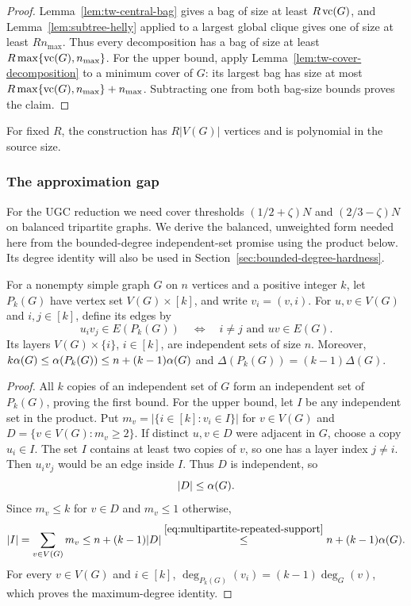 \begin{proof}
Lemma~\ref{lem:tw-central-bag} gives a bag of size at least $R\operatorname{vc}(G)$,
and Lemma~\ref{lem:subtree-helly} applied to a largest global clique
gives one of size at least $Rn_{\max}$.
Thus every decomposition has a bag of size at least
$R\max\{\operatorname{vc}(G),n_{\max}\}$. For the upper bound, apply
Lemma~\ref{lem:tw-cover-decomposition} to a minimum cover of $G$:
its largest bag has size at most
$R\max\{\operatorname{vc}(G),n_{\max}\}+n_{\max}$. Subtracting one from both
bag-size bounds proves the claim.
\end{proof}

For fixed $R$, the construction has $R|V(G)|$ vertices and is
polynomial in the source size.

\subsubsection{The approximation gap}
\label{subsec:ugc-tw-gap}

For the UGC reduction we need cover thresholds $(1/2+\zeta)N$ and
$(2/3-\zeta)N$ on balanced tripartite graphs.
We derive the balanced, unweighted form needed here from the
bounded-degree independent-set promise using the product below. Its degree
identity will also be used in
Section~\ref{sec:bounded-degree-hardness}.

\begin{lemma}\label{lem:multipartite-product}
For a nonempty simple graph $G$ on $n$ vertices and a positive integer
$k$, let $P_k(G)$ have vertex set $V(G)\times[k]$, and write
$v_i=(v,i)$. For $u,v\in V(G)$ and $i,j\in[k]$, define its edges by
\[
 u_iv_j\in E(P_k(G))\quad\Longleftrightarrow\quad
 i\ne j\text{ and }uv\in E(G).
\]
Its layers $V(G)\times\{i\}$, $i\in[k]$, are independent sets of size $n$. Moreover,
$k\alpha(G)\le\alpha(P_k(G))\le n+(k-1)\alpha(G)$ and
$\Delta(P_k(G))=(k-1)\Delta(G)$.
\end{lemma}

\begin{proof}
All $k$ copies of an independent set of $G$ form an independent
set of $P_k(G)$, proving the first bound. For the upper bound, let
$I$ be any independent set in the product. Put
$m_v=|\{i\in[k]:v_i\in I\}|$ for $v\in V(G)$ and
$D=\{v\in V(G):m_v\ge2\}$. If distinct $u,v\in D$
were adjacent in $G$, choose a copy $u_i\in I$. The set $I$ contains
at least two copies of $v$, so one has a layer index $j\ne i$. Then
$u_iv_j$ would be an edge inside $I$. Thus $D$ is independent, so
\begin{equation}\label{eq:multipartite-repeated-support}
 |D|\leq\alpha(G).
\end{equation}
Since $m_v\leq k$ for $v\in D$ and $m_v\leq1$ otherwise,
\[
 |I|=\sum_{v\in V(G)}m_v\leq n+(k-1)|D|
 \overset{\eqref{eq:multipartite-repeated-support}}{\leq}
 n+(k-1)\alpha(G).
\]
For every $v\in V(G)$ and $i\in[k]$,
$\deg_{P_k(G)}(v_i)=(k-1)\deg_G(v)$,
which proves the maximum-degree identity.
\end{proof}

